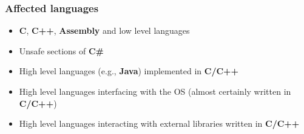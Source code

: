 \documentclass[a4paper, 10pt, titlepage]{article}
\begin{document}
\subsubsection*{Affected languages}
\begin{itemize}
\item \textbf{C}, \textbf{C++}, \textbf{Assembly} and low level languages
\item Unsafe sections of \textbf{C\#}
\item High level languages (e.g., \textbf{Java}) implemented in \textbf{C/C++}
\item High level languages interfacing with the OS (almost certainly
written in \textbf{C/C++})
\item High level languages interacting with external libraries written in \textbf{C/C++}
\end{itemize}
\newpage
\end{document}
